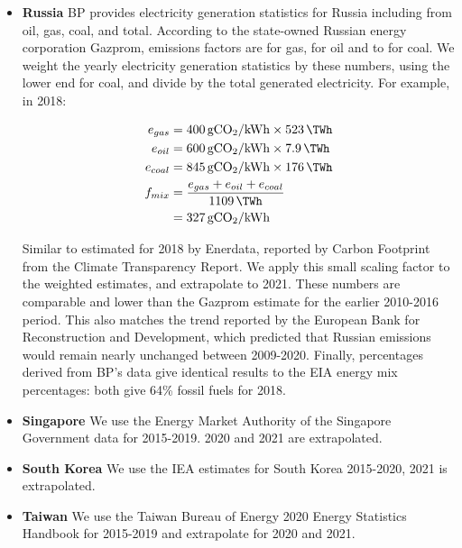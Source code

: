 \begin{appendices}
\begin{itemize}
    \item \textbf{Russia} BP\cite{bp_statistical_2021} provides electricity generation statistics for Russia including from oil, gas, coal, and total. According to the state-owned Russian energy corporation Gazprom\cite{gazprom_pjsc_2019}, emissions factors are  for gas,  for oil and  to  for coal. We weight the yearly electricity generation statistics by these numbers, using the lower end  for coal, and divide by the total generated electricity. For example, in 2018:

    \begin{align*}
    e_{gas} & = \ef{400}\times\SI{523}{\TWh} \\
    e_{oil} & = \ef{600}\times\SI{7.9}{\TWh} \\
    e_{coal} & = \ef{845}\times\SI{176}{\TWh} \\
    f_{mix} & = \frac{e_{gas}+e_{oil}+e_{coal}}{\SI{1109}{\TWh}} \\
     & = \ef{327}
    \end{align*}

    Similar to  estimated for 2018 by Enerdata\cite{enerdata_market_2021}, reported by Carbon Footprint\cite{carbon_footprint_carbonfootprintcom_2020} from the Climate Transparency Report\cite{climate_transparency_brown_2018}. We apply this small scaling factor to the weighted estimates, and extrapolate to 2021. These numbers are comparable and lower than the Gazprom estimate  for the earlier 2010-2016 period\cite[50]{gazprom_pjsc_2019}. This also matches the trend reported by the European Bank for Reconstruction and Development\cite{schreider_development_2011}, which predicted that Russian emissions would remain nearly unchanged between 2009-2020. Finally, percentages derived from BP's data give identical results to the EIA energy mix percentages: both give 64\% fossil fuels for 2018.
    
    \item \textbf{Singapore} We use the Energy Market Authority of the Singapore Government\cite{energy_market_authority_singapore_2021} data for 2015-2019. 2020 and 2021 are extrapolated.
    
    \item \textbf{South Korea} We use the IEA\cite{iea_development_2020} estimates for South Korea 2015-2020, 2021 is extrapolated.
    
    \item \textbf{Taiwan} We use the Taiwan Bureau of Energy 2020 Energy Statistics Handbook for 2015-2019\cite[17]{taiwan_bureau_of_energy_energy_2020} and extrapolate for 2020 and 2021.
    

\end{itemize}
\end{appendices}
